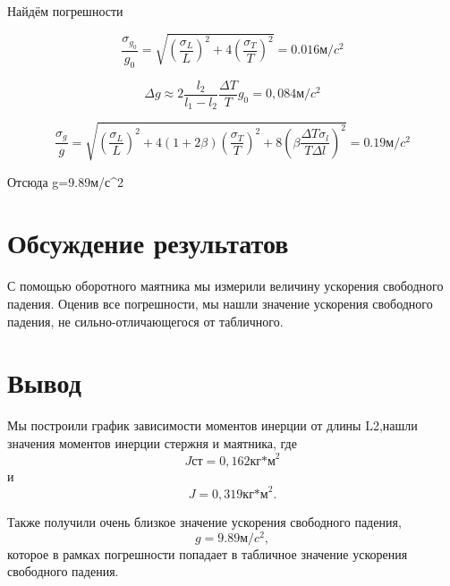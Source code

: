 \documentclass[a4paper, 10pt]{article}%
\begin{document}
Найдём погрешности

\[\frac{\sigma_{g_0}}{g_0} = \sqrt{(\frac{\sigma_L}{L})^2 + 4(\frac{\sigma_T}{T})^2} = 0.016 \text{м}/c^2 \]

\[\Delta g \approx 2 \frac{l_2}{l_1 - l_2} \frac{\Delta T}{T} g_0 = 0,084 \text{м}/c^2 \] 

\[\frac{\sigma_g}{g} = \sqrt{(\frac{\sigma_L}{L})^2 + 4(1+2\beta)(\frac{\sigma_T}{T})^2 + 8(\beta \frac{\Delta T \sigma_l}{T \Delta l})^2} = 0.19 \text{м}/c^2\]

Отсюда g=9.89м/с^2

\section{Обсуждение результатов}
С помощью оборотного маятника мы измерили величину ускорения свободного падения. Оценив все погрешности, мы нашли значение ускорения свободного падения, не сильно-отличающегося от табличного.

\section{Вывод}
Мы построили график зависимости моментов инерции от длины L2,нашли значения моментов инерции стержня и маятника, где \[Jст=0,162 \text{кг*м}^2\]
 и \[J = 0,319 \text{кг*м}^2.\]
\par
Также получили очень близкое значение ускорения свободного падения, \[g=9.89\text{м}/c^2,\] которое в рамках погрешности попадает в табличное значение ускорения свободного падения.
\end{document}
